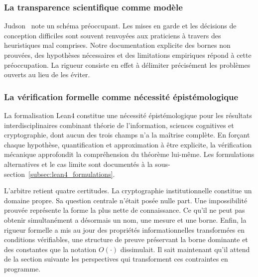 \begin{sloppypar}
\subsubsection{La transparence scientifique comme mod\`ele}
\label{subsubsec:transparence_scientifique}

Judson~\cite{Judson22} note un sch\'ema pr\'eoccupant. Les mises en garde
et les d\'ecisions de conception difficiles sont souvent renvoy\'ees aux
praticiens \`a travers des heuristiques mal comprises. Notre
documentation explicite des bornes non prouv\'ees, des hypoth\`eses
n\'ecessaires et des limitations empiriques r\'epond \`a cette
pr\'eoccupation. La rigueur consiste en effet \`a d\'elimiter pr\'ecis\'ement les probl\`emes
ouverts au lieu de les \'eviter.

\subsubsection{La v\'erification formelle comme n\'ecessit\'e \'epist\'emologique}
\label{subsubsec:verification_necessite}

La formalisation Lean4 constitue une n\'ecessit\'e
\'epist\'emologique pour les r\'esultats interdisciplinaires combinant
th\'eorie de l'information, sciences cognitives et cryptographie, dont
aucun des trois champs n'a la ma\^itrise compl\`ete. En for\c{c}ant chaque
hypoth\`ese, quantification et approximation \`a \^etre explicite, la
v\'erification m\'ecanique approfondit la compr\'ehension du
th\'eor\`eme lui-m\^eme. Les formulations alternatives et le cas limite sont
document\'es \`a la sous-section~\ref{subsec:lean4_formulations}.
\end{sloppypar}

\begin{boiteArbitre}
L'arbitre retient quatre certitudes. La cryptographie institutionnelle
constitue un domaine propre. Sa question centrale n'\'etait pos\'ee nulle part.
Une impossibilit\'e prouv\'ee repr\'esente la forme la plus nette de
connaissance. Ce qu'il ne peut pas obtenir simultan\'ement a
d\'esormais un nom, une mesure et une borne. Enfin, la rigueur formelle a
mis au jour des propri\'et\'es
informationnelles transform\'ees en conditions v\'erifiables, une
structure de preuve pr\'eservant la borne dominante et des constantes que
la notation $O(\cdot)$ dissimulait. Il sait maintenant qu'il attend
de la section suivante les perspectives qui transforment ces contraintes
en programme.
\end{boiteArbitre}

